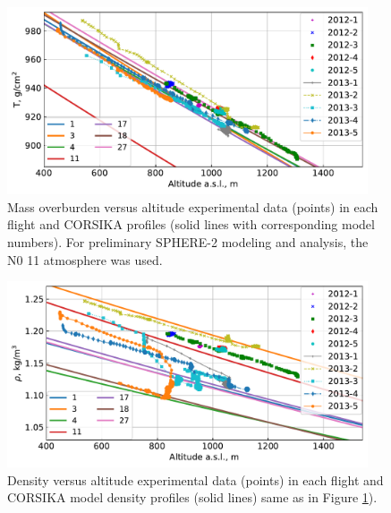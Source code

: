 \documentclass[universe,article,accept,moreauthors,pdftex]{Definitions/mdpi}
\begin{document}
\begin{figure}[H]
       \includegraphics[width=0.95\textwidth]{figs/atmosphere_T.pdf}
       \caption{Mass overburden versus altitude experimental data (points) in each flight and CORSIKA profiles (solid lines with corresponding model numbers). For preliminary SPHERE-2 modeling and analysis, the N0 11 atmosphere was used.}
        \label{fig:massoverburden}
        \end{figure}
        \unskip
\begin{figure}[H]
        \includegraphics[width=0.95\textwidth]{figs/atmosphere_rho.pdf}
        \caption{Density versus altitude experimental data (points) in each flight and CORSIKA model density profiles (solid lines) same as in Figure \ref{fig:massoverburden}).}
        \label{fig:density}
\end{figure}
\end{document}
